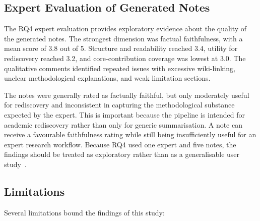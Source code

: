 \documentclass[runningheads]{llncs}
\begin{document}
\subsection{Expert Evaluation of Generated Notes}

The RQ4 expert evaluation provides exploratory evidence about the
quality of the generated notes. The strongest dimension was factual
faithfulness, with a mean score of 3.8 out of 5. Structure and
readability reached 3.4, utility for rediscovery reached 3.2, and
core-contribution coverage was lowest at 3.0. The qualitative comments
identified repeated issues with excessive wiki-linking, unclear
methodological explanations, and weak limitation sections.

The notes were generally rated as factually faithful, but only
moderately useful for rediscovery and inconsistent in capturing the
methodological substance expected by the expert. This is important
because the pipeline is intended for academic rediscovery rather than
only for generic summarisation. A note can receive a favourable
faithfulness rating while still being insufficiently useful for an
expert research workflow. Because RQ4 used one expert and five notes,
the findings should be treated as exploratory rather than as a
generalisable user study~\cite{fabbri2021summeval}.

\subsection{Limitations}

Several limitations bound the findings of this study:
\end{document}
